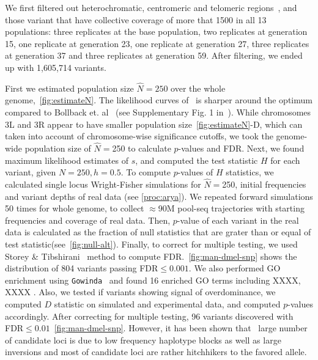 We first filtered out heterochromatic,
centromeric and telomeric
regions~\cite{fiston2010drosophila}, and those variant that have collective 
coverage of more that 1500 in all 13 populations: three replicates at the base 
population, two replicates at generation 15, one replicate at generation 23, 
one replicate at generation 27, three replicates at generation 37 and three 
replicates at generation 59. After filtering, we ended up with 1,605,714 
variants.

First we estimated population size $\hat{N}=250$ over the whole 
genome,~\ref{fig:estimateN}. 
The likelihood curves of \comale\ is sharper around the optimum compared to 
Bollback et. al~\cite{bollback2008estimation} (see Supplementary Fig. 1 
in~\cite{orozco2012adaptation}).
While chromosomes 3L and 3R 
appear to have smaller population size~\ref{fig:estimateN}-D, which can taken 
into account of 
chromosome-wise significance cutoffs, we took the genome-wide population size 
of $\widehat{N}=$250 to calculate $p$-values and FDR.
Next, we found maximum likelihood estimates of $s$, and computed the test 
statistic $H$ for each variant, given $N=250, h=0.5$. To compute $p$-values of 
$H$ statistics, we calculated 
single locus Wright-Fisher simulations for $\widehat{N}=$250, initial 
frequencies and variant depths of real data (see \ref{proc:arya}). We repeated 
forward simulations 50 times for whole genome, to collect $\approx$90M pool-seq 
trajectories 
with starting frequencies and coverage of real data. Then, $p$-value of each 
variant in the real 
data is calculated as the fraction of null statistics that are grater than or 
equal of test statistic(see~\ref{fig:null-alt}). Finally, to correct for 
multiple 
testing, we used 
Storey \& Tibshirani~\cite{storey2003statistical} method to compute 
FDR.~\ref{fig:man-dmel-snp} shows the distribution of 804 variants 
passing FDR$\le 
0.001$. We also performed GO
enrichment using \texttt{Gowinda}~\cite{kofler2012gowinda} and found 16 
enriched GO terms including XXXX, XXXX . Also, we tested 
if variants showing signal of overdominance, we computed $D$ 
statistic on simulated and experimental data, and computed $p$-values 
accordingly. After correcting for multiple testing, 96 variants discovered with 
FDR$\le 0.01$~\ref{fig:man-dmel-snp}. However, it has been shown 
that~\cite{tobler2014massive,franssen2015patterns}  large number of candidate 
loci is due to low frequency haplotype blocks as 
well as large inversions and most of candidate loci are rather hitchhikers to 
the favored allele.

